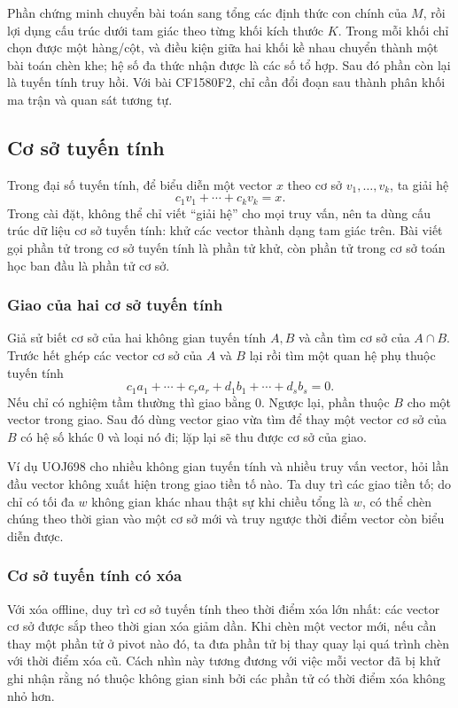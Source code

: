 \documentclass[11pt]{article}
\begin{document}
Phần chứng minh chuyển bài toán sang tổng các định thức con chính của $M$, rồi
lợi dụng cấu trúc dưới tam giác theo từng khối kích thước $K$. Trong mỗi khối
chỉ chọn được một hàng/cột, và điều kiện giữa hai khối kề nhau chuyển thành một
bài toán chèn khe; hệ số đa thức nhận được là các số tổ hợp. Sau đó phần còn lại
là tuyến tính truy hồi. Với bài CF1580F2, chỉ cần đổi đoạn sau thành phân khối
ma trận và quan sát tương tự.

\subsection{Cơ sở tuyến tính}

Trong đại số tuyến tính, để biểu diễn một vector $x$ theo cơ sở
$v_1,\ldots,v_k$, ta giải hệ
\[
  c_1v_1+\cdots+c_kv_k=x.
\]
Trong cài đặt, không thể chỉ viết “giải hệ” cho mọi truy vấn, nên ta dùng cấu
trúc dữ liệu cơ sở tuyến tính: khử các vector thành dạng tam giác trên. Bài viết
gọi phần tử trong cơ sở tuyến tính là phần tử khử, còn phần tử trong cơ sở toán
học ban đầu là phần tử cơ sở.

\subsubsection{Giao của hai cơ sở tuyến tính}

Giả sử biết cơ sở của hai không gian tuyến tính $A,B$ và cần tìm cơ sở của
$A\cap B$. Trước hết ghép các vector cơ sở của $A$ và $B$ lại rồi tìm một quan
hệ phụ thuộc tuyến tính
\[
  c_1a_1+\cdots+c_ra_r+d_1b_1+\cdots+d_sb_s=0.
\]
Nếu chỉ có nghiệm tầm thường thì giao bằng $0$. Ngược lại, phần thuộc $B$ cho
một vector trong giao. Sau đó dùng vector giao vừa tìm để thay một vector cơ sở
của $B$ có hệ số khác $0$ và loại nó đi; lặp lại sẽ thu được cơ sở của giao.

Ví dụ UOJ698 cho nhiều không gian tuyến tính và nhiều truy vấn vector, hỏi lần
đầu vector không xuất hiện trong giao tiền tố nào. Ta duy trì các giao tiền tố;
do chỉ có tối đa $w$ không gian khác nhau thật sự khi chiều tổng là $w$, có thể
chèn chúng theo thời gian vào một cơ sở mới và truy ngược thời điểm vector còn
biểu diễn được.

\subsubsection{Cơ sở tuyến tính có xóa}

Với xóa offline, duy trì cơ sở tuyến tính theo thời điểm xóa lớn nhất: các vector
cơ sở được sắp theo thời gian xóa giảm dần. Khi chèn một vector mới, nếu cần thay
một phần tử ở pivot nào đó, ta đưa phần tử bị thay quay lại quá trình chèn với
thời điểm xóa cũ. Cách nhìn này tương đương với việc mỗi vector đã bị khử ghi
nhận rằng nó thuộc không gian sinh bởi các phần tử có thời điểm xóa không nhỏ
hơn.
\end{document}
